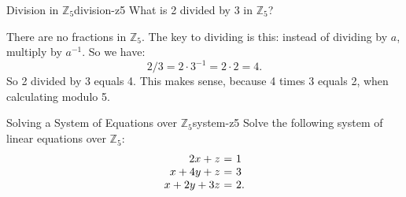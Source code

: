\begin{example}{Division in $\mathbb{Z}_5$}{division-z5}
  What is 2 divided by 3 in $\mathbb{Z}_5$?
\end{example}

\begin{solution}
  There are no fractions in $\mathbb{Z}_5$. The key to dividing is
  this: instead of dividing by $a$, multiply by $a^{-1}$. So we have:
  \begin{equation*}
    2/3 = 2\cdot 3^{-1} = 2\cdot 2 = 4.
  \end{equation*}
  So 2 divided by 3 equals 4. This makes sense, because 4 times 3
  equals 2, when calculating modulo 5.
\end{solution}

\begin{example}{Solving a System of Equations over $\mathbb{Z}_5$}{system-z5}
  Solve the following system of linear equations over $\mathbb{Z}_5$:
  \begin{equation*}
    \begin{array}{r@{~}c@{~}l}
      2x + z &=& 1 \\
      x+4y+z &=& 3 \\
      x+2y+3z &=& 2. \\
    \end{array}
  \end{equation*}
\end{example}

